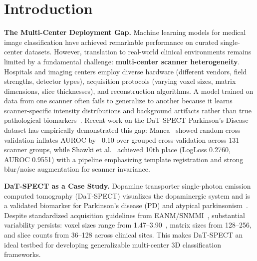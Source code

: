 \section{Introduction}
\label{sec:introduction}

\noindent\textbf{The Multi-Center Deployment Gap.}
Machine learning models for medical image classification have achieved remarkable performance on curated single-center datasets. However, translation to real-world clinical environments remains limited by a fundamental challenge: \textbf{multi-center scanner heterogeneity}. Hospitals and imaging centers employ diverse hardware (different vendors, field strengths, detector types), acquisition protocols (varying voxel sizes, matrix dimensions, slice thicknesses), and reconstruction algorithms. A model trained on data from one scanner often fails to generalize to another because it learns scanner-specific intensity distributions and background artifacts rather than true pathological biomarkers~\cite{esteban2020leakage,roberts2021common}. Recent work on the DaT-SPECT Parkinson's Disease dataset has empirically demonstrated this gap: Manca~\cite{manca2024dat} showed random cross-validation inflates AUROC by ~0.10 over grouped cross-validation across 131 scanner groups, while Shawki et al.~\cite{shawki2024dat} achieved 10th place (LogLoss 0.2760, AUROC 0.9551) with a pipeline emphasizing template registration and strong blur/noise augmentation for scanner invariance.

\noindent\textbf{DaT-SPECT as a Case Study.}
Dopamine transporter single-photon emission computed tomography (DaT-SPECT) visualizes the dopaminergic system and is a validated biomarker for Parkinson's disease (PD) and atypical parkinsonism~\cite{benamer2000dat,darcourt2010eanm}. Despite standardized acquisition guidelines from EANM/SNMMI~\cite{darcourt2010eanm}, substantial variability persists: voxel sizes range from 1.47--3.90~\voxelunit, matrix sizes from 128--256, and slice counts from 36--128 across clinical sites. This makes DaT-SPECT an ideal testbed for developing generalizable multi-center 3D classification frameworks.

